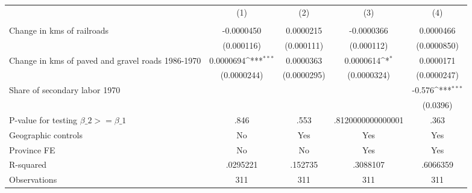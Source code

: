 {
\def\sym#1{\ifmmode^{#1}\else\(^{#1}\)\fi}
\begin{tabular}{l*{4}{c}}
\hline\hline
                &\multicolumn{1}{c}{(1)}&\multicolumn{1}{c}{(2)}&\multicolumn{1}{c}{(3)}&\multicolumn{1}{c}{(4)}\\
                &\multicolumn{1}{c}{}&\multicolumn{1}{c}{}&\multicolumn{1}{c}{}&\multicolumn{1}{c}{}\\
\hline
Change in kms of railroads&-0.0000450         &0.0000215         &-0.0000366         &0.0000466         \\
                &(0.000116)         &(0.000111)         &(0.000112)         &(0.0000850)         \\
[1em]
Change in kms of paved and gravel roads 1986-1970&0.0000694\sym{***}&0.0000363         &0.0000614\sym{*}  &0.0000171         \\
                &(0.0000244)         &(0.0000295)         &(0.0000324)         &(0.0000247)         \\
[1em]
Share of secondary labor 1970&                  &                  &                  &   -0.576\sym{***}\\
                &                  &                  &                  & (0.0396)         \\
\hline
P-value for testing $\beta\_{2} >= \beta\_{1}$&     .846         &     .553         &.8120000000000001         &     .363         \\
Geographic controls&       No         &      Yes         &      Yes         &      Yes         \\
Province FE     &       No         &       No         &      Yes         &      Yes         \\
R-squared       & .0295221         &  .152735         & .3088107         & .6066359         \\
Observations    &      311         &      311         &      311         &      311         \\
\hline\hline
\end{tabular}
}
